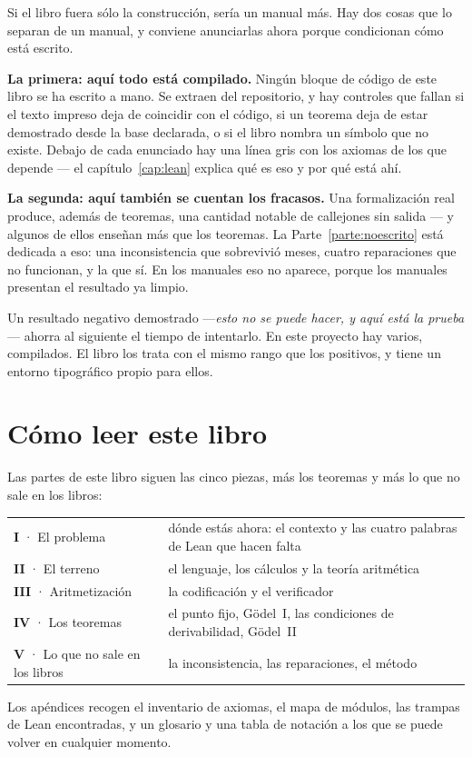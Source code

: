 Si el libro fuera sólo la construcción, sería un manual más. Hay dos cosas que lo separan de un
manual, y conviene anunciarlas ahora porque condicionan cómo está escrito.

\textbf{La primera: aquí todo está compilado.} Ningún bloque de código de este libro se ha escrito a
mano. Se extraen del repositorio, y hay controles que fallan si el texto impreso deja de coincidir
con el código, si un teorema deja de estar demostrado desde la base declarada, o si el libro nombra
un símbolo que no existe. Debajo de cada enunciado hay una línea gris con los axiomas de los que
depende — el capítulo~\ref{cap:lean} explica qué es eso y por qué está ahí.

\textbf{La segunda: aquí también se cuentan los fracasos.} Una formalización real produce, además de
teoremas, una cantidad notable de callejones sin salida — y algunos de ellos enseñan más que los
teoremas. La Parte~\ref{parte:noescrito} está dedicada a eso: una inconsistencia que sobrevivió meses, cuatro
reparaciones que no funcionan, y la que sí. En los manuales eso no aparece, porque los manuales
presentan el resultado ya limpio.

\begin{leccion}
Un resultado negativo demostrado —\emph{esto no se puede hacer, y aquí está la prueba}— ahorra al
siguiente el tiempo de intentarlo. En este proyecto hay varios, compilados. El libro los trata con
el mismo rango que los positivos, y tiene un entorno tipográfico propio para ellos.
\end{leccion}

\section{Cómo leer este libro}

Las partes de este libro siguen las cinco piezas, más los teoremas y más lo que no sale en los
libros:

\begin{center}\small
\begin{tabularx}{\linewidth}{@{}l >{\raggedright\arraybackslash}X@{}}
\toprule
\textbf{I} · El problema & dónde estás ahora: el contexto y las cuatro palabras de Lean que hacen falta \\
\textbf{II} · El terreno & el lenguaje, los cálculos y la teoría aritmética \\
\textbf{III} · Aritmetización & la codificación y el verificador \\
\textbf{IV} · Los teoremas & el punto fijo, Gödel~I, las condiciones de derivabilidad, Gödel~II \\
\textbf{V} · Lo que no sale en los libros & la inconsistencia, las reparaciones, el método \\
\bottomrule
\end{tabularx}
\end{center}

\noindent Los apéndices recogen el inventario de axiomas, el mapa de módulos, las trampas de Lean
encontradas, y un glosario y una tabla de notación a los que se puede volver en cualquier momento.
